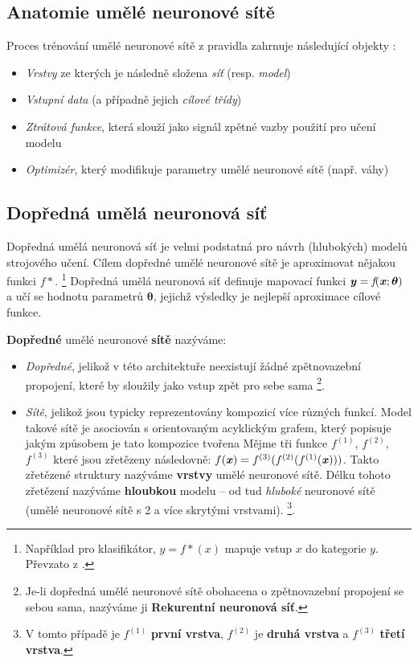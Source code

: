 \subsection{Anatomie umělé neuronové sítě}
Proces trénování umělé neuronové sítě z pravidla zahrnuje následující objekty \cite{Chollet2017}:
\begin{itemize}
    \item \emph{Vrstvy} ze kterých je následně složena \emph{síť} (resp. \emph{model})
    \item \emph{Vstupní data} (a případně jejich \emph{cílové třídy})
    \item \emph{Ztrátová funkce}, která slouží jako signál zpětné vazby použití pro učení modelu
    \item \emph{Optimizér}, který modifikuje parametry umělé neuronové sítě (např. váhy)
\end{itemize}

\subsection{Dopředná umělá neuronová síť}
\label{sec:feedforward_nn}
Dopředná umělá neuronová síť je velmi podstatná pro návrh (hlubokých) modelů strojového učení.
Cílem dopředné umělé neuronové sítě je aproximovat nějakou funkci $f*$.
\footnote{Například pro klasifikátor, $y=f*(x)$ mapuje vstup $x$ do kategorie $y$. Převzato z \cite{Goodfellow2016}.}
Dopředná umělá neuronová síť definuje mapovací funkci $\textbf{\emph{y}} = \emph{f}(\textbf{\emph{x}};\boldsymbol{\theta})$ a učí se hodnotu parametrů $\boldsymbol{\theta}$, jejichž výsledky je nejlepší aproximace cílové funkce. \cite{Goodfellow2016}

\textbf{Dopředné} umělé neuronové \textbf{sítě} nazýváme:
\begin{itemize}
    \item \emph{Dopředné}, jelikož v této architektuře neexistují žádné zpětnovazební propojení, které by sloužily jako vstup zpět pro sebe sama
    \footnote{Je-li dopředná umělé neuronové sítě obohacena o zpětnovazební propojení se sebou sama, nazýváme ji \textbf{Rekurentní neuronová síť}.}.
    \item \emph{Sítě}, jelikož jsou typicky reprezentovány kompozicí více různých funkcí.
    Model takové sítě je asociován s orientovaným acyklickým grafem, který popisuje jakým způsobem je tato kompozice tvořena
    Mějme tři funkce $f^{(1)}$, $f^{(2)}$, $f^{(3)}$ které jsou zřetězeny následovně: $f(\textbf{\emph{x}}) = f^{(3)}(f^{(2)}(f^{(1)}(\textbf{\emph{x}})))$.
    Takto zřetězené struktury nazýváme \textbf{vrstvy} umělé neuronové sítě. Délku tohoto zřetězení nazýváme \textbf{hloubkou} modelu – od tud \emph{hluboké} neuronové sítě (umělé neuronové sítě s 2 a více skrytými vrstvami). \cite{Goodfellow2016}
    \footnote{V tomto případě je $f^{(1)}$ \textbf{první vrstva}, $f^{(2)}$ je \textbf{druhá vrstva} a $f^{(3)}$ \textbf{třetí vrstva}.}.
\end{itemize}

